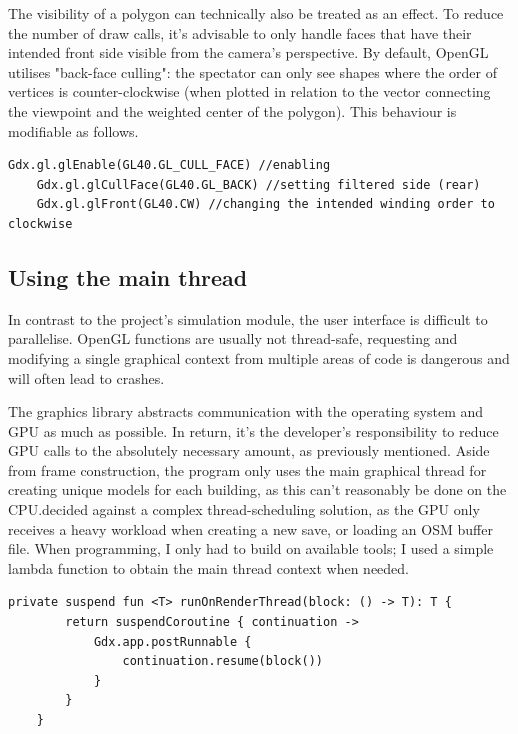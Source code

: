 The visibility of a polygon can technically also be treated as an effect. To reduce the number of draw calls, it's advisable to only handle faces that have their intended front side visible from the camera's perspective. By default, OpenGL utilises "back-face culling": the spectator can only see shapes where the order of vertices is counter-clockwise (when plotted in relation to the vector connecting the viewpoint and the weighted center of the polygon). This behaviour is modifiable as follows.

\begin{lstlisting}[caption=Example for changing OpenGL's culling properties through libGDX]
    Gdx.gl.glEnable(GL40.GL_CULL_FACE) //enabling
    Gdx.gl.glCullFace(GL40.GL_BACK) //setting filtered side (rear)
    Gdx.gl.glFront(GL40.CW) //changing the intended winding order to clockwise
\end{lstlisting}

\subsection{Using the main thread}

In contrast to the project's simulation module, the user interface is difficult to parallelise. OpenGL functions are usually not thread-safe, requesting and modifying a single graphical context from multiple areas of code is dangerous and will often lead to crashes.

The graphics library abstracts communication with the operating system and GPU as much as possible. In return, it's the developer's responsibility to reduce GPU calls to the absolutely necessary amount, as previously mentioned. Aside from frame construction, the program only uses the main graphical thread for creating unique models for each building, as this can't reasonably be done on the CPU.\@I decided against a complex thread-scheduling solution, as the GPU only receives a heavy workload when creating a new save, or loading an OSM buffer file. When programming, I only had to build on available tools; I used a simple lambda function to obtain the main thread context when needed.

\begin{lstlisting}[caption=Helper function for getting the draw thread]
private suspend fun <T> runOnRenderThread(block: () -> T): T {
        return suspendCoroutine { continuation ->
            Gdx.app.postRunnable {
                continuation.resume(block())
            }
        }
    }
\end{lstlisting}

